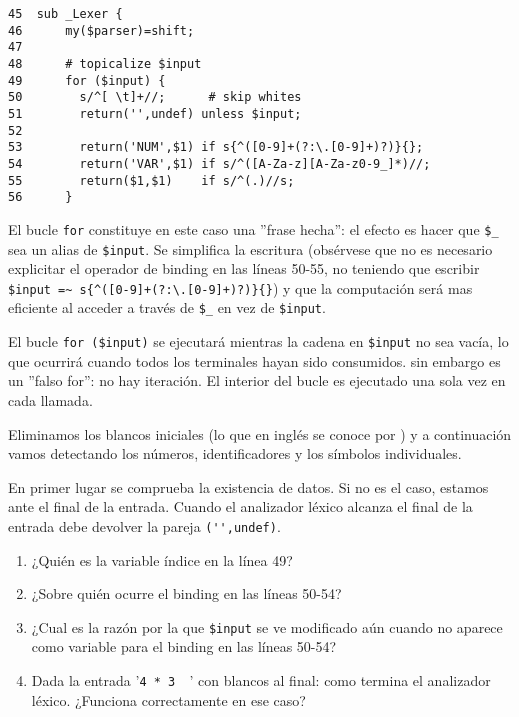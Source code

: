 \begin{verbatim}
45  sub _Lexer {
46      my($parser)=shift;
47
48      # topicalize $input
49      for ($input) {
50        s/^[ \t]+//;      # skip whites
51        return('',undef) unless $input;
52
53        return('NUM',$1) if s{^([0-9]+(?:\.[0-9]+)?)}{};
54        return('VAR',$1) if s/^([A-Za-z][A-Za-z0-9_]*)//;
55        return($1,$1)    if s/^(.)//s;
56      }
\end{verbatim}

El bucle \verb|for| constituye
en este caso una ''frase hecha'': el efecto es hacer que \verb|$_| sea un 
alias de \verb|$input|. Se simplifica la escritura (obsérvese que no es
necesario explicitar el operador de binding en las líneas 50-55,
no teniendo que escribir \verb|$input =~ s{^([0-9]+(?:\.[0-9]+)?)}{}|)
y que la computación será mas eficiente al acceder a través de \verb|$_| en vez de \verb|$input|.

El bucle \verb|for ($input)|
se ejecutará mientras la cadena
en \verb|$input| no sea vacía, lo que ocurrirá cuando todos 
los terminales hayan sido consumidos. sin embargo es un ''falso for'':
no hay iteración. El interior del bucle es ejecutado una sola vez en cada
llamada.

Eliminamos los blancos iniciales (lo que en inglés se conoce por
) y a
continuación vamos detectando los números, identificadores
y los símbolos individuales. 

En primer lugar se comprueba la existencia de
datos. Si no es el caso, estamos ante el
final de la entrada.
Cuando el analizador léxico alcanza el final de la entrada
debe devolver la pareja \verb|('',undef)|.

\begin{exercise}
\begin{enumerate}
\item ¿Quién es la variable índice en la línea 49? 
\item ¿Sobre quién ocurre el binding en las líneas 50-54? 
\item ¿Cual es la razón por la que \verb|$input| se 
ve modificado aún cuando no aparece como variable para el binding en las líneas 50-54?
\item Dada la entrada '\verb|4 * 3  |' con blancos al final:
como termina el analizador léxico. ¿Funciona correctamente en ese caso?
\end{enumerate}
\end{exercise}


